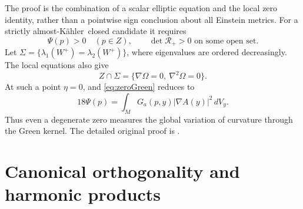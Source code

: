 \documentclass[11pt,a4paper]{article}
\theoremstyle{definition}
\theoremstyle{remark}
\newcommand{\cR}{\mathcal R}
\newcommand{\AK}{almost-K\"ahler}
\begin{document}
The proof is the combination of a scalar elliptic equation and the local zero identity, rather than a pointwise sign conclusion about all Einstein metrics. For a strictly \AK\ closed candidate it requires
\[
 \Psi(p)>0\quad(p\in Z),\qquad \det\cR_+>0\text{ on some open set}.
\]
Let $\Sigma=\{\lambda_1(W^+)=\lambda_2(W^+)\}$, where eigenvalues are ordered decreasingly. The local equations also give
\[
 Z\cap\Sigma=\{\nabla\Omega=0,\ \nabla^2\Omega=0\}.
\]
At such a point $\eta=0$, and \eqref{eq:zeroGreen} reduces to
\[
 18\Psi(p)=\int_MG_a(p,y)|\nabla A(y)|^2\,dV_y.
\]
Thus even a degenerate zero measures the global variation of curvature through the Green kernel. The detailed original proof is \cite{GreenSource}.

\section{Canonical orthogonality and harmonic products}
\end{document}
